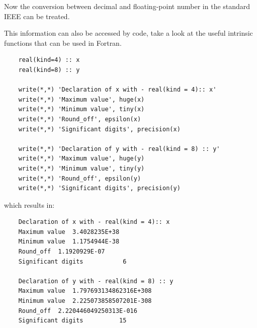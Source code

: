 Now the conversion between decimal and floating-point number in the standard IEEE can be treated.














This information can also be accessed by code, take a look at the useful intrinsic functions that can be used in Fortran.

\begin{verbatim}
    real(kind=4) :: x
    real(kind=8) :: y
    
    write(*,*) 'Declaration of x with - real(kind = 4):: x'
    write(*,*) 'Maximum value', huge(x)
    write(*,*) 'Minimum value', tiny(x)
    write(*,*) 'Round_off', epsilon(x)
    write(*,*) 'Significant digits', precision(x)
    
    write(*,*) 'Declaration of y with - real(kind = 8) :: y'
    write(*,*) 'Maximum value', huge(y)
    write(*,*) 'Minimum value', tiny(y)
    write(*,*) 'Round_off', epsilon(y)
    write(*,*) 'Significant digits', precision(y)
\end{verbatim}

which results in:

\begin{verbatim}
    Declaration of x with - real(kind = 4):: x
    Maximum value  3.4028235E+38
    Minimum value  1.1754944E-38
    Round_off  1.1920929E-07
    Significant digits           6
    
    Declaration of y with - real(kind = 8) :: y
    Maximum value  1.797693134862316E+308
    Minimum value  2.225073858507201E-308
    Round_off  2.220446049250313E-016
    Significant digits          15
\end{verbatim}

